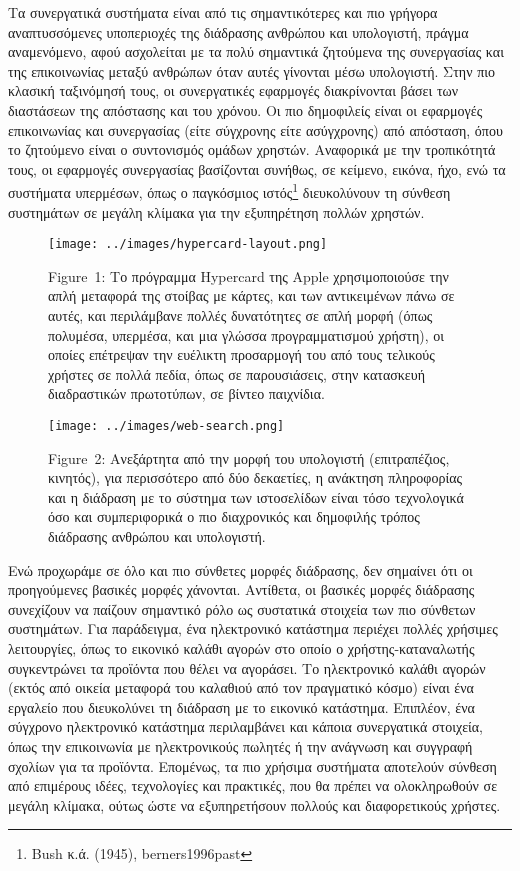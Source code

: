 \documentclass[
]{article}
\begin{document}
Τα συνεργατικά συστήματα είναι από τις σημαντικότερες και πιο γρήγορα
αναπτυσσόμενες υποπεριοχές της διάδρασης ανθρώπου και υπολογιστή, πράγμα
αναμενόμενο, αφού ασχολείται με τα πολύ σημαντικά ζητούμενα της
συνεργασίας και της επικοινωνίας μεταξύ ανθρώπων όταν αυτές γίνονται
μέσω υπολογιστή. Στην πιο κλασική ταξινόμησή τους, οι συνεργατικές
εφαρμογές διακρίνονται βάσει των διαστάσεων της απόστασης και του
χρόνου. Οι πιο δημοφιλείς είναι οι εφαρμογές επικοινωνίας και
συνεργασίας (είτε σύγχρονης είτε ασύγχρονης) από απόσταση, όπου το
ζητούμενο είναι ο συντονισμός ομάδων χρηστών. Αναφορικά με την
τροπικότητά τους, οι εφαρμογές συνεργασίας βασίζονται συνήθως, σε
κείμενο, εικόνα, ήχο, ενώ τα συστήματα υπερμέσων, όπως ο παγκόσμιος
ιστός\footnote{Bush κ.ά. (1945), berners1996past} διευκολύνουν τη
σύνθεση συστημάτων σε μεγάλη κλίμακα για την εξυπηρέτηση πολλών χρηστών.

\leavevmode{}%
\begin{figure}
\hypertarget{fig:hypercard-layout}{%
\centering
\texttt{[image: ../images/hypercard-layout.png]}
\caption{Figure~1: Το πρόγραμμα Hypercard της Apple χρησιμοποιούσε την
απλή μεταφορά της στοίβας με κάρτες, και των αντικειμένων πάνω σε αυτές,
και περιλάμβανε πολλές δυνατότητες σε απλή μορφή (όπως πολυμέσα,
υπερμέσα, και μια γλώσσα προγραμματισμού χρήστη), οι οποίες επέτρεψαν
την ευέλικτη προσαρμογή του από τους τελικούς χρήστες σε πολλά πεδία,
όπως σε παρουσιάσεις, στην κατασκευή διαδραστικών πρωτοτύπων, σε βίντεο
παιχνίδια.}\label{fig:hypercard-layout}
}
\end{figure}

\leavevmode{}%
\begin{figure}
\hypertarget{fig:web-search}{%
\centering
\texttt{[image: ../images/web-search.png]}
\caption{Figure~2: Ανεξάρτητα από την μορφή του υπολογιστή
(επιτραπέζιος, κινητός), για περισσότερο από δύο δεκαετίες, η ανάκτηση
πληροφορίας και η διάδραση με το σύστημα των ιστοσελίδων είναι τόσο
τεχνολογικά όσο και συμπεριφορικά ο πιο διαχρονικός και δημοφιλής τρόπος
διάδρασης ανθρώπου και υπολογιστή.}\label{fig:web-search}
}
\end{figure}

Ενώ προχωράμε σε όλο και πιο σύνθετες μορφές διάδρασης, δεν σημαίνει ότι
οι προηγούμενες βασικές μορφές χάνονται. Αντίθετα, οι βασικές μορφές
διάδρασης συνεχίζουν να παίζουν σημαντικό ρόλο ως συστατικά στοιχεία των
πιο σύνθετων συστημάτων. Για παράδειγμα, ένα ηλεκτρονικό κατάστημα
περιέχει πολλές χρήσιμες λειτουργίες, όπως το εικονικό καλάθι αγορών στο
οποίο ο χρήστης-καταναλωτής συγκεντρώνει τα προϊόντα που θέλει να
αγοράσει. Το ηλεκτρονικό καλάθι αγορών (εκτός από οικεία μεταφορά του
καλαθιού από τον πραγματικό κόσμο) είναι ένα εργαλείο που διευκολύνει τη
διάδραση με το εικονικό κατάστημα. Επιπλέον, ένα σύγχρονο ηλεκτρονικό
κατάστημα περιλαμβάνει και κάποια συνεργατικά στοιχεία, όπως την
επικοινωνία με ηλεκτρονικούς πωλητές ή την ανάγνωση και συγγραφή σχολίων
για τα προϊόντα. Επομένως, τα πιο χρήσιμα συστήματα αποτελούν σύνθεση
από επιμέρους ιδέες, τεχνολογίες και πρακτικές, που θα πρέπει να
ολοκληρωθούν σε μεγάλη κλίμακα, ούτως ώστε να εξυπηρετήσουν πολλούς και
διαφορετικούς χρήστες.
\end{document}
